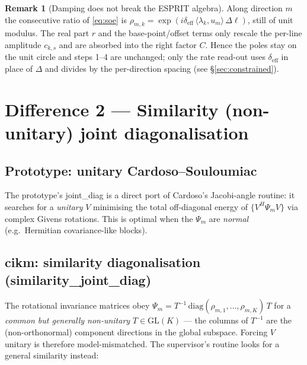 \documentclass[11pt]{article}
\newcommand{\inner}[2]{\langle #1, #2 \rangle}
\newcommand{\lam}{\bm{\lambda}}
\newcommand{\bu}{\bm{u}}
\newcommand{\deff}{\delta_{\mathrm{eff}}}
\newcommand{\code}[1]{\texttt{\small #1}}
\def\code#1{#1}%
\def\small{}%
\def\bm#1{#1}%
\theoremstyle{definition}
\newtheorem{remark}{Remark}
\begin{document}
\begin{remark}[Damping does not break the ESPRIT algebra]
Along direction $m$ the consecutive ratio of \eqref{eq:soe} is
$\rho_{m,k}=\exp(i\deff\,\inner{\lam_k}{\bu_m}\,\Delta\ell)$, still of unit modulus. The real
part $r$ and the base-point/offset terms only rescale the per-line amplitude $c_{k,s}$ and are
absorbed into the right factor $C$. Hence the poles stay on the unit circle and steps 1--4 are
unchanged; only the rate read-out uses $\deff$ in place of $\Delta$ and divides by the
per-direction spacing (see \S\ref{sec:constrained}).
\end{remark}

\section{Difference 2 --- Similarity (non-unitary) joint diagonalisation}

\subsection{Prototype: unitary Cardoso--Souloumiac}
The prototype's \code{joint\_diag} is a direct port of Cardoso's Jacobi-angle routine: it
searches for a \emph{unitary} $V$ minimising the total off-diagonal energy of
$\{V^{H}\Psi_m V\}$ via complex Givens rotations. This is optimal when the $\Psi_m$ are
\emph{normal} (e.g.\ Hermitian covariance-like blocks).

\subsection{cikm: similarity diagonalisation (\code{similarity\_joint\_diag})}
The rotational invariance matrices obey $\Psi_m = T^{-1}\,\mathrm{diag}(\rho_{m,1},\dots,\rho_{m,K})\,T$
for a \emph{common but generally non-unitary} $T\in\mathrm{GL}(K)$ --- the columns of $T^{-1}$
are the (non-orthonormal) component directions in the global subspace. Forcing $V$ unitary is
therefore model-mismatched. The supervisor's routine looks for a general similarity instead:
\end{document}
